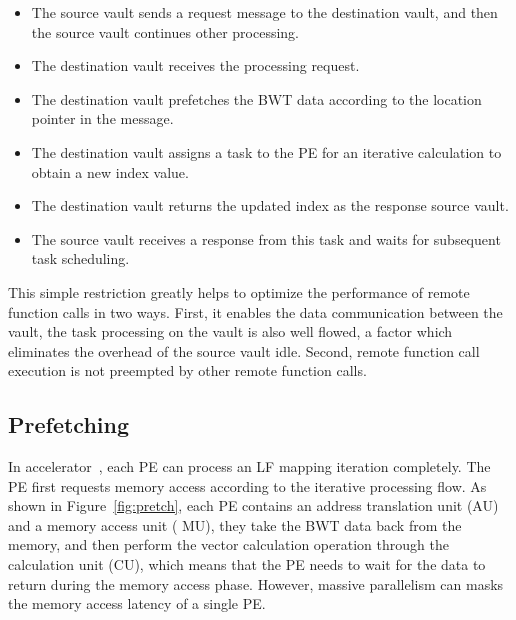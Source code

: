 \documentclass[9pt,conference]{IEEEtran}
\begin{document}
\begin{itemize}
    \item The source vault sends a request message to the destination vault, and then the source vault continues other processing.
    
    \item The destination vault receives the processing request.
    
    \item The destination vault prefetches the BWT data according to the location pointer in the message.
    
    \item The destination vault assigns a task to the PE for an iterative calculation to obtain a new index value.
    
    \item The destination vault returns the updated index as the response source vault.
    
    \item The source vault receives a response from this task and waits for subsequent task scheduling.
\end{itemize}

This simple restriction greatly helps to optimize the performance of remote function calls in two ways. First, it enables the data communication between the vault, the task processing
on the vault is also well flowed, a factor which eliminates the overhead of the source vault idle. Second, remote function call execution is not preempted by other remote function calls.

\subsection{Prefetching}
\label{sec:arch:prefetch}
In accelerator~\cite{yuanrong}, each PE can process an LF mapping iteration completely. The PE first requests memory access according to the iterative processing flow. As shown in Figure~\ref{fig:pretch}, each PE contains an address translation unit (AU) and a memory access unit ( MU), they take the BWT data back from the memory, and then perform the vector calculation operation through the calculation unit (CU), which means that the PE needs to wait for the data to return during the memory access phase. However, massive parallelism can masks the memory access latency of a single PE. 
\end{document}
